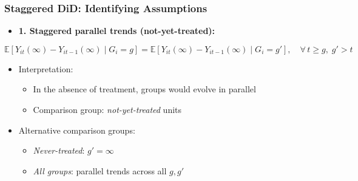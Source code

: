 \documentclass[12pt, compress]{beamer}
\begin{document}
\begin{frame}
	\frametitle{Staggered DiD: Identifying Assumptions}

\begin{itemize}
	\item \textbf{1. Staggered parallel trends (not-yet-treated):}
\end{itemize}

\begin{equation*}
\mathbb{E}[Y_{it}(\infty) - Y_{it-1}(\infty) \mid G_i = g] 
= \mathbb{E}[Y_{it}(\infty) - Y_{it-1}(\infty) \mid G_i = g'], 
\quad \forall\, t \geq g,\; g' > t
\end{equation*}

\begin{itemize}
	\item Interpretation:
	\begin{itemize}
		\item In the absence of treatment, groups would evolve in parallel
		\item Comparison group: \textit{not-yet-treated} units
	\end{itemize}
	
	\medskip
	
	\item Alternative comparison groups:
	\begin{itemize}
		\item \textit{Never-treated}: $g' = \infty$
		\item \textit{All groups}: parallel trends across all $g, g'$
	\end{itemize}
\end{itemize}

\end{frame}
\end{document}
